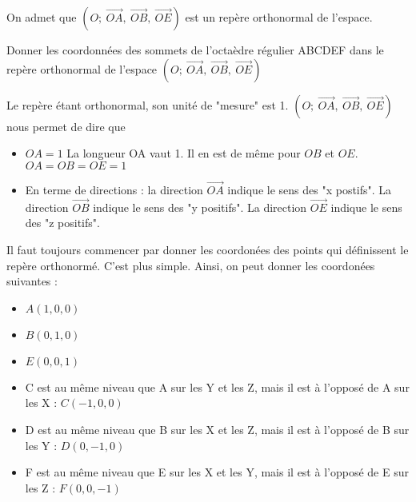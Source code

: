 \documentclass[answers]{exam}
\begin{document}
On admet que $\left(O\mathpunct{} ; \ \overrightarrow{OA}\mathpunct{}, \ \overrightarrow{OB}\mathpunct{}, \ \overrightarrow{OE}\right)$ est un repère orthonormal de l'espace.
\begin{questions}
  \question[2] Donner les coordonnées des sommets de l'octaèdre régulier ABCDEF dans le repère orthonormal de l'espace $\left(O\mathpunct{} ; \ \overrightarrow{OA}\mathpunct{}, \ \overrightarrow{OB}\mathpunct{}, \ \overrightarrow{OE}\right)$
  \begin{solution}

  Le repère étant orthonormal, son unité de "mesure" est 1. $\left(O\mathpunct{} ; \ \overrightarrow{OA}\mathpunct{}, \ \overrightarrow{OB}\mathpunct{}, \ \overrightarrow{OE}\right)$ nous permet de dire que 
  \begin{itemize}[noitemsep]
    \item $OA = 1$ La longueur OA vaut 1. Il en est de même pour $OB$ et $OE$. $OA = OB = OE = 1$
    \item En terme de directions : la direction $\overrightarrow{OA}$ indique le sens des "x postifs". La direction $\overrightarrow{OB}$ indique le sens des "y positifs". La direction $\overrightarrow{OE}$ indique le sens des "z positifs".
  \end{itemize}

  Il faut toujours commencer par donner les coordonées des points qui définissent le repère orthonormé. C'est plus simple. Ainsi, on peut donner les coordonées suivantes : 
  \begin{itemize}[noitemsep]
    \item $A(1,0,0)$
    \item $B(0,1,0)$
    \item $E(0,0,1)$
    \item C est au même niveau que A sur les Y et les Z, mais il est à l'opposé de A sur les X : $C(-1,0,0)$
    \item D est au même niveau que B sur les X et les Z, mais il est à l'opposé de B sur les Y : $D(0,-1,0)$
    \item F est au même niveau que E sur les X et les Y, mais il est à l'opposé de E sur les Z : $F(0,0,-1)$
  \end{itemize}



\end{solution}
\end{questions}
\end{document}
